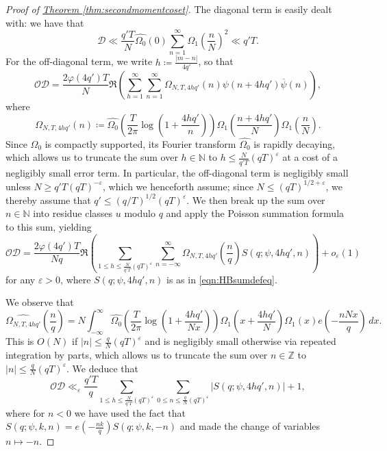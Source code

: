 \documentclass[11pt,a4paper]{amsart}
\newcommand{\e}{\varepsilon}
\newcommand{\N}{\mathbb{N}}
\newcommand{\Z}{\mathbb{Z}}
\numberwithin{equation}{section}
\theoremstyle{remark}
\theoremstyle{definition}
\begin{document}
\begin{proof}[Proof of {\hyperref[thm:secondmomentcoset]{Theorem \ref*{thm:secondmomentcoset}}}]
The diagonal term is easily dealt with: we have that
\[\mathcal{D} \ll \frac{q'T}{N} \widehat{\Omega_0}(0) \sum_{n = 1}^{\infty} \Omega_1\left(\frac{n}{N}\right)^2 \ll q' T.\]
For the off-diagonal term, we write $h \coloneqq \frac{|m - n|}{4q'}$, so that
\[\mathcal{OD} = \frac{2\varphi(4q') T}{N} \Re\left(\sum_{h = 1}^{\infty} \sum_{n = 1}^{\infty} \Omega_{N,T,4hq'}(n) \psi(n + 4hq') \overline{\psi}(n)\right),\]
where
\[\Omega_{N,T,4hq'}(n) \coloneqq \widehat{\Omega_0}\left(\frac{T}{2\pi}\log\left(1 + \frac{4hq'}{n}\right)\right) \Omega_1\left(\frac{n + 4hq'}{N}\right) \Omega_1\left(\frac{n}{N}\right).\]
Since $\Omega_0$ is compactly supported, its Fourier transform $\widehat{\Omega_0}$ is rapidly decaying, which allows us to truncate the sum over $h \in \N$ to $h \leq \frac{N}{q'T} (qT)^{\e}$ at a cost of a negligibly small error term. In particular, the off-diagonal term is negligibly small unless $N \geq q' T (qT)^{-\e}$, which we henceforth assume; since $N \leq (qT)^{1/2 + \e}$, we thereby assume that $q' \leq (q/T)^{1/2} (qT)^{\e}$. We then break up the sum over $n \in \N$ into residue classes $u$ modulo $q$ and apply the Poisson summation formula to this sum, yielding
\[\mathcal{OD} = \frac{2\varphi(4q') T}{Nq} \Re\left(\sum_{1 \leq h \leq \frac{N}{q'T} (qT)^{\e}} \sum_{n = -\infty}^{\infty} \widehat{\Omega_{N,T,4hq'}}\left(\frac{n}{q}\right) S(q;\psi,4hq',n)\right) + o_{\e}(1)\]
for any $\e > 0$, where $S(q;\psi,4hq',n)$ is as in \eqref{eqn:HBsumdefeq}.

We observe that
\[\widehat{\Omega_{N,T,4hq'}}\left(\frac{n}{q}\right) = N \int_{-\infty}^{\infty} \widehat{\Omega_0}\left(\frac{T}{2\pi}\log\left(1+\frac{4hq'}{Nx}\right)\right) \Omega_1\left(x + \frac{4hq'}{N}\right) \Omega_1(x) e\left(-\frac{nNx}{q}\right) \, dx.\]
This is $O(N)$ if $|n| \leq \frac{q}{N} (qT)^{\e}$ and is negligibly small otherwise via repeated integration by parts, which allows us to truncate the sum over $n \in \Z$ to $|n| \leq \frac{q}{N} (qT)^{\e}$. We deduce that
\[\mathcal{OD} \ll_{\e} \frac{q' T}{q} \sum_{1 \leq h \leq \frac{N}{q'T} (qT)^{\e}} \sum_{0 \leq n \leq \frac{q}{N} (qT)^{\e}} |S(q;\psi,4hq',n)| + 1,\]
where for $n < 0$ we have used the fact that $S(q;\psi,k,n) = e\left(-\frac{nk}{q}\right) S(q;\psi,k,-n)$ and made the change of variables $n \mapsto -n$.


\end{proof}
\end{document}
